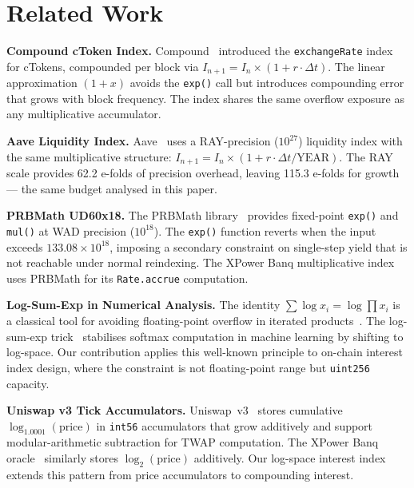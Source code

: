 \documentclass[10pt,a4paper,twocolumn]{article}
\begin{document}
\section{Related Work}
\label{sec:related}

\textbf{Compound cToken Index.} Compound~\cite{compound2019} introduced the \texttt{exchangeRate} index for cTokens, compounded per block via $I_{n+1} = I_n \times (1 + r \cdot \Delta t)$. The linear approximation $(1+x)$ avoids the \texttt{exp()} call but introduces compounding error that grows with block frequency. The index shares the same overflow exposure as any multiplicative accumulator.

\textbf{Aave Liquidity Index.} Aave~\cite{aave2020} uses a RAY-precision ($10^{27}$) liquidity index with the same multiplicative structure: $I_{n+1} = I_n \times (1 + r \cdot \Delta t / \text{YEAR})$. The RAY scale provides 62.2 e-folds of precision overhead, leaving 115.3 e-folds for growth --- the same budget analysed in this paper.

\textbf{PRBMath UD60x18.} The PRBMath library~\cite{prbmath} provides fixed-point \texttt{exp()} and \texttt{mul()} at WAD precision ($10^{18}$). The \texttt{exp()} function reverts when the input exceeds $133.08 \times 10^{18}$, imposing a secondary constraint on single-step yield that is not reachable under normal reindexing. The XPower Banq multiplicative index uses PRBMath for its \texttt{Rate.accrue} computation.

\textbf{Log-Sum-Exp in Numerical Analysis.} The identity $\sum \log x_i = \log \prod x_i$ is a classical tool for avoiding floating-point overflow in iterated products~\cite{higham2002}. The log-sum-exp trick~\cite{blanchard2021} stabilises softmax computation in machine learning by shifting to log-space. Our contribution applies this well-known principle to on-chain interest index design, where the constraint is not floating-point range but \texttt{uint256} capacity.

\textbf{Uniswap v3 Tick Accumulators.} Uniswap~v3~\cite{uniswap2021} stores cumulative $\log_{1.0001}(\text{price})$ in \texttt{int56} accumulators that grow additively and support modular-arithmetic subtraction for TWAP computation. The XPower Banq oracle~\cite{wp} similarly stores $\log_2(\text{price})$ additively. Our log-space interest index extends this pattern from price accumulators to compounding interest.
\end{document}
